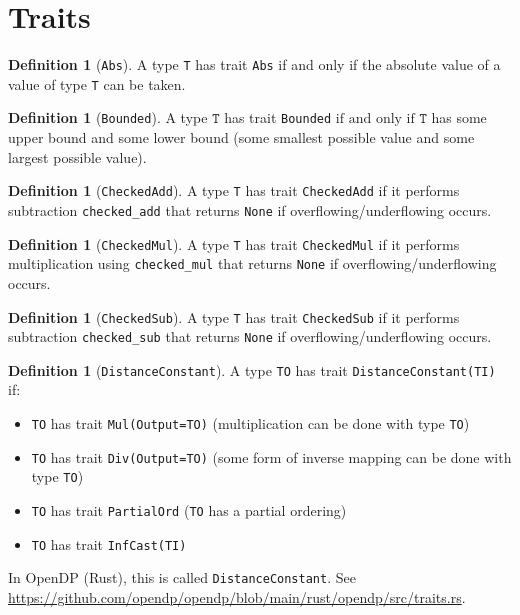\documentclass[11pt,a4paper]{article}
\theoremstyle{definition}
\newtheorem{definition}[theorem]{Definition}
\newcommand{\inOpenDPRust}[2]{In OpenDP (Rust), this is called \texttt{#1}. See \url{#2}.}
\newcommand{\T}{\texttt{T}}
\newcommand{\iffText}{\text{if and only if}}
\begin{document}
\section{Traits}
\begin{definition}[\texttt{Abs}]
    A type \texttt{T} has trait \texttt{Abs} if and only if the absolute value of a value of type \texttt{T} can be taken.
\end{definition}
\begin{definition}[\texttt{Bounded}]
    A type $\T$ has trait \texttt{Bounded} $\iffText$ $\T$ has some upper bound and some lower bound (some smallest possible value and some largest possible value).
\end{definition}
\begin{definition}[\texttt{CheckedAdd}]
    A type \texttt{T} has trait \texttt{CheckedAdd} if it performs subtraction \texttt{checked\_add} that returns \texttt{None} if overflowing/underflowing occurs.
\end{definition}
\begin{definition}[\texttt{CheckedMul}]
    A type \texttt{T} has trait \texttt{CheckedMul} if it performs multiplication using \texttt{checked\_mul} that returns \texttt{None} if overflowing/underflowing occurs.
\end{definition}
\begin{definition}[\texttt{CheckedSub}]
    A type \texttt{T} has trait \texttt{CheckedSub} if it performs subtraction \texttt{checked\_sub} that returns \texttt{None} if overflowing/underflowing occurs.
\end{definition}
\begin{definition}[\texttt{DistanceConstant}]
    A type \texttt{TO} has trait \texttt{DistanceConstant(TI)} if:
    \begin{itemize}
        \item \texttt{TO} has trait \texttt{Mul(Output=TO)} (multiplication can be done with type \texttt{TO})
        \item \texttt{TO} has trait \texttt{Div(Output=TO)} (some form of inverse mapping can be done with type \texttt{TO})
        \item \texttt{TO} has trait \texttt{PartialOrd} (\texttt{TO} has a partial ordering)
        \item \texttt{TO} has trait \texttt{InfCast(TI)}
    \end{itemize}
    
    \inOpenDPRust{DistanceConstant}{https://github.com/opendp/opendp/blob/main/rust/opendp/src/traits.rs}
\end{definition}
\end{document}
